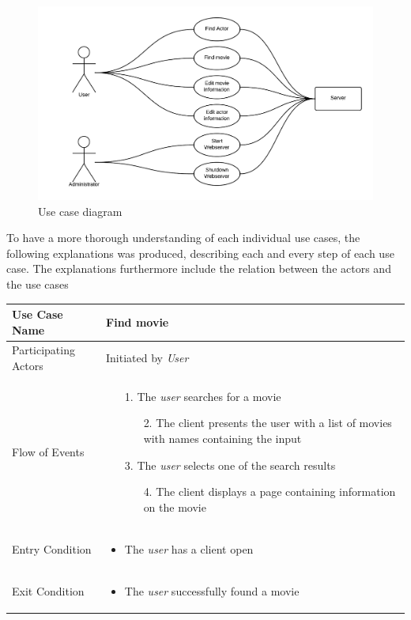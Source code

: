 \begin{figure}[H]
\includegraphics[width=\linewidth]{img/RAD/usecasediagram.png}
\caption{Use case diagram}
\label{fig:use case diagram}
\end{figure}

To have a more thorough understanding of each individual use cases, the following explanations was produced, describing each and every step of each use case.
The explanations furthermore include the relation between the actors and the use cases


\begin{center}
	\begin{tabular}{ | l | p{10cm} |  }
		 \hline
		Use Case Name & Find movie \\ \hline
		Participating Actors & Initiated by \emph{User} \\ \hline
		Flow of Events & \begin{enumerate}
						\item[1.] The \emph{user} searches for a movie
						\begin{enumerate}
							\item[2.] The client presents the user with a list of movies with names containing the input
						\end{enumerate}
						\item[3.] The \emph{user} selects one of the search results
						\begin{enumerate}
							\item[4.] The client displays a page containing information on the movie
						\end{enumerate}
					\end{enumerate} \\ \hline
		Entry Condition & \begin{itemize}
						\item The \emph{user} has a client open
					\end{itemize} \\ \hline
		Exit Condition & \begin{itemize}
						\item The \emph{user} successfully found a movie
					\end{itemize} \\
		\hline
	\end{tabular}
\end{center}

